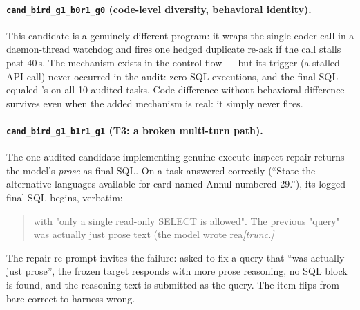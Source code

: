\paragraph{\texttt{cand\_bird\_g1\_b0r1\_g0} (code-level diversity,
behavioral identity).} This candidate is a genuinely different program: it
wraps the single coder call in a daemon-thread watchdog and fires one hedged
duplicate re-ask if the call stalls past 40\,s. The mechanism exists in the
control flow --- but its trigger (a stalled API call) never occurred in the
audit: zero SQL executions, and the final SQL equaled \bare's on all 10
audited tasks. Code difference without behavioral difference survives even
when the added mechanism is real: it simply never fires.

\paragraph{\texttt{cand\_bird\_g1\_b1r1\_g1} (T3: a broken multi-turn
path).} The one audited candidate implementing genuine execute-inspect-repair
returns the model's \emph{prose} as final SQL. On a task \bare{} answered
correctly (``State the alternative languages available for card named Annul
numbered 29.''), its logged final SQL begins, verbatim:
\begin{quote}\small\ttfamily
with "only a single read-only SELECT is allowed". The previous "query" was
actually just prose text (the model wrote rea\emph{[trunc.]}
\end{quote}
The repair re-prompt invites the failure: asked to fix a query that ``was
actually just prose'', the frozen target responds with more prose reasoning,
no SQL block is found, and the reasoning text is submitted as the query. The
item flips from bare-correct to harness-wrong.
